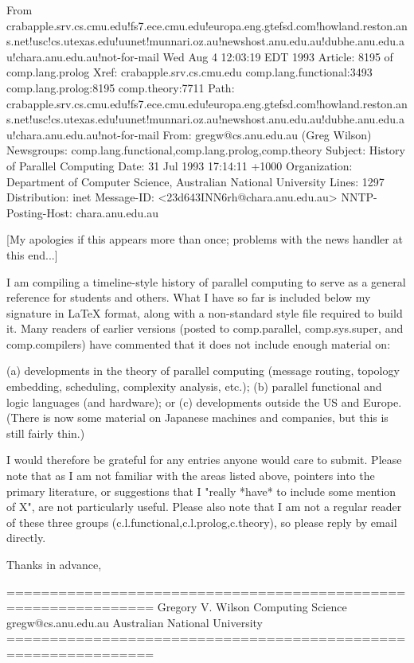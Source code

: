 From crabapple.srv.cs.cmu.edu!fs7.ece.cmu.edu!europa.eng.gtefsd.com!howland.reston.ans.net!usc!cs.utexas.edu!uunet!munnari.oz.au!newshost.anu.edu.au!dubhe.anu.edu.au!chara.anu.edu.au!not-for-mail Wed Aug  4 12:03:19 EDT 1993
Article: 8195 of comp.lang.prolog
Xref: crabapple.srv.cs.cmu.edu comp.lang.functional:3493 comp.lang.prolog:8195 comp.theory:7711
Path: crabapple.srv.cs.cmu.edu!fs7.ece.cmu.edu!europa.eng.gtefsd.com!howland.reston.ans.net!usc!cs.utexas.edu!uunet!munnari.oz.au!newshost.anu.edu.au!dubhe.anu.edu.au!chara.anu.edu.au!not-for-mail
From: gregw@cs.anu.edu.au (Greg Wilson)
Newsgroups: comp.lang.functional,comp.lang.prolog,comp.theory
Subject: History of Parallel Computing
Date: 31 Jul 1993 17:14:11 +1000
Organization: Department of Computer Science, Australian National University
Lines: 1297
Distribution: inet
Message-ID: <23d643INN6rh@chara.anu.edu.au>
NNTP-Posting-Host: chara.anu.edu.au

[My apologies if this appears more than once; problems with the news
handler at this end...]

I am compiling a timeline-style history of parallel computing to serve
as a general reference for students and others.  What I have so far is
included below my signature in LaTeX format, along with a non-standard
style file required to build it.  Many readers of earlier versions
(posted to comp.parallel, comp.sys.super, and comp.compilers) have
commented that it does not include enough material on:

(a) developments in the theory of parallel computing (message routing,
    topology embedding, scheduling, complexity analysis, etc.);
(b) parallel functional and logic languages (and hardware); or
(c) developments outside the US and Europe.  (There is now some material
    on Japanese machines and companies, but this is still fairly thin.)

I would therefore be grateful for any entries anyone would care to
submit.  Please note that as I am not familiar with the areas listed
above, pointers into the primary literature, or suggestions that I
"really *have* to include some mention of X", are not particularly
useful.  Please also note that I am not a regular reader of these
three groups (c.l.functional,c.l.prolog,c.theory), so please reply by
email directly.

Thanks in advance,

     ===============================================================
              Gregory V. Wilson   Computing Science
            gregw@cs.anu.edu.au   Australian National University
     ===============================================================


